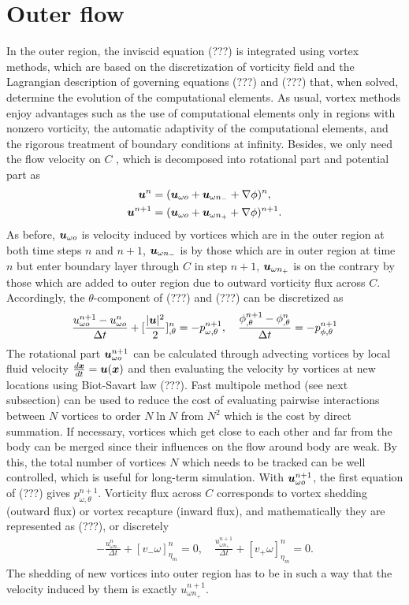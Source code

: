 \section{Outer flow}
In the outer region, the inviscid equation (???) is integrated using vortex methods, which are based on the discretization of vorticity field and the Lagrangian description of governing equations (???) and (???) that, when solved, determine the evolution of the computational elements.
As usual, vortex methods enjoy advantages such as the use of computational elements only in regions with nonzero vorticity, the automatic adaptivity of the computational elements, and the rigorous treatment of boundary conditions at infinity.
Besides, we only need the flow velocity on $C$ , which is decomposed into rotational part and potential part as
\begin{align}
\boldsymbol{u}^n &  = (\boldsymbol{u}_{\omega o} + \boldsymbol{u}_{\omega n_-} + \nabla \phi)^n, \\
\boldsymbol{u}^{n+1} & = (\boldsymbol{u}_{\omega o}+ \boldsymbol{u}_{\omega n_+} + \nabla \phi)^{n+1}.
\end{align}
As before, $\boldsymbol{u}_{\omega o}$ is velocity induced by vortices which are in the outer region at both time steps $n$ and $n+1$, $\boldsymbol{u}_{\omega n_-}$ is by those which are in outer region at time $n$ but enter boundary layer through $C$ in step $n+1$, $\boldsymbol{u}_{\omega n_+}$ is on the contrary by those which are added to outer region due to outward vorticity flux across $C$.
Accordingly, the $\theta$-component of (???) and (???) can be discretized as
\begin{align} \label{eqn:Eulersplit}
\frac{u_{\omega o}^{n+1}-u_{\omega o}^{n} }{\Delta t} +  [\frac{|\boldsymbol{u}|^2}{2}]^n_{,\theta}  =   -p_{\omega,\theta}^{n+1},  \quad
\frac{{\phi}_{,\theta}^{n+1}-{\phi}_{,\theta}^{n} }{\Delta t}  =   -p_{\phi,\theta}^{n+1}
\end{align}
The rotational part $\boldsymbol{u}_{\omega o}^{n+1}$ can be calculated through advecting vortices by local fluid velocity $\frac{d\boldsymbol{x}}{dt} = \boldsymbol{u}(\boldsymbol{x})$ and then evaluating the velocity by vortices at new locations using Biot-Savart law (???).
Fast multipole method (see next subsection) can be used to reduce the cost of evaluating pairwise interactions between $N$ vortices to order $N\ln N$ from $N^2$ which is the cost by direct summation.
If necessary, vortices which get close to each other and far from the body can be merged since their influences on the flow around body are weak.
By this, the total number of vortices $N$ which needs to be tracked can be well controlled, which is useful for long-term simulation.
With $\boldsymbol{u}_{\omega o}^{n+1}$, the first equation of (???) gives $p_{\omega,\theta}^{n+1}$.
Vorticity flux across $C$ corresponds to vortex shedding (outward flux) or vortex recapture (inward flux), and mathematically they are represented as (???), or discretely
\begin{align} \label{eqn:vorticityflux}
-\frac{u_{\omega n_-}^n}{\Delta t} + [v_- \omega]_{\eta_m}^n = 0, \quad
\frac{u_{\omega n_+}^{n+1}}{\Delta t} + [v_+ \omega]_{\eta_m}^n = 0.
\end{align}
The shedding of new vortices into outer region has to be in such a way that the velocity induced by them is exactly $u_{\omega n_+}^{n+1}$.

